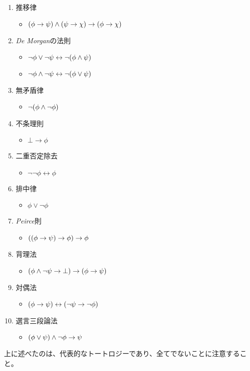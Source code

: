 {\begin{enumerate}
\begin{itemize}
    \end{itemize}
    \item 推移律
    \begin{itemize}
      \item $\qty(\phi \rightarrow \psi) \land \qty(\psi \rightarrow \chi) \rightarrow \qty(\phi \rightarrow \chi)$
    \end{itemize}
    \item \textit{De Morgan}の法則
    \begin{itemize}
      \item $\lnot \phi \lor \lnot \psi \leftrightarrow \lnot \qty(\phi \land \psi)$
      \item $\lnot \phi \land \lnot \psi \leftrightarrow \lnot \qty(\phi \lor \psi)$
    \end{itemize}
    \item 無矛盾律
    \begin{itemize}
      \item $\lnot \qty(\phi \land \lnot \phi)$
    \end{itemize}
    \item 不条理則
    \begin{itemize}
      \item $\bot \rightarrow \phi$
    \end{itemize}
    \item 二重否定除去
    \begin{itemize}
      \item $\lnot \lnot \phi \leftrightarrow \phi$
    \end{itemize}
    \item 排中律
    \begin{itemize}
      \item $\phi \lor \lnot \phi$
    \end{itemize}
    \item \textit{Peirce}則
    \begin{itemize}
      \item $\qty(\qty(\phi \rightarrow \psi) \rightarrow \phi) \rightarrow \phi$
    \end{itemize}
    \item 背理法
    \begin{itemize}
      \item $\qty(\phi \land \lnot \psi \rightarrow \bot) \rightarrow \qty(\phi \rightarrow \psi)$
    \end{itemize}
    \item 対偶法
    \begin{itemize}
      \item $\qty(\phi \rightarrow \psi) \leftrightarrow \qty(\lnot \psi \rightarrow \lnot \phi)$
    \end{itemize}
    \item 選言三段論法
    \begin{itemize}
      \item $\qty(\phi \lor \psi) \land \lnot \phi \rightarrow \psi$
    \end{itemize}
  \end{enumerate}
}
上に述べたのは、代表的なトートロジーであり、全てでないことに注意すること。


